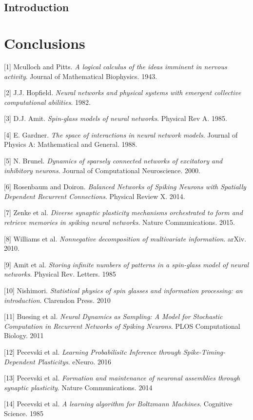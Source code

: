 \documentclass{ucetd}
\begin{document}
\section{Introduction}

\chapter{Conclusions}


\makebibliography

[1] Mculloch and Pitts. \textit{A logical calculus of the ideas imminent in nervous activity}. Journal of Mathematical Biophysics. 1943.

[2] J.J. Hopfield. \textit{Neural networks and physical systems with emergent collective computational abilities}. 1982.

[3] D.J. Amit. \textit{Spin-glass models of neural networks}. Physical Rev A. 1985.

[4] E. Gardner. \textit{The space of interactions in neural network models}. Journal of Physics A: Mathematical and General. 1988.

[5] N. Brunel. \textit{Dynamics of sparsely connected networks of excitatory and inhibitory neurons}. Journal of Computational Neuroscience. 2000. 

[6] Rosenbaum and Doiron. \textit{Balanced Networks of Spiking Neurons with Spatially Dependent Recurrent Connections}. Physical Review X. 2014.

[7] Zenke et al. \textit{Diverse synaptic plasticity mechanisms
orchestrated to form and retrieve memories
in spiking neural networks}. Nature Communications. 2015.

[8] Williams et al. \textit{Nonnegative decomposition of multivariate information}. arXiv. 2010.

[9] Amit et al. \textit{Storing infinite numbers of patterns in a spin-glass model of neural networks}. Physical Rev. Letters. 1985

[10] Nishimori. \textit{Statistical physics of spin glasses and information processing: an introduction}. Clarendon Press. 2010

[11] Buesing et al. \textit{Neural Dynamics as Sampling: A Model for Stochastic Computation in Recurrent Networks of Spiking Neurons}. PLOS Computational Biology. 2011

[12] Pecevski et al. \textit{Learning Probabilisitc Inference through Spike-Timing-Dependent Plasticitys}. eNeuro. 2016

[13] Pecevski et al. \textit{Formation and maintenance of neuronal assemblies through synaptic plasticity}. Nature Communications. 2014

[14] Pecevski et al. \textit{A learning algorithm for Boltzmann Machines}. Cognitive Science. 1985

%
%
\end{document}
